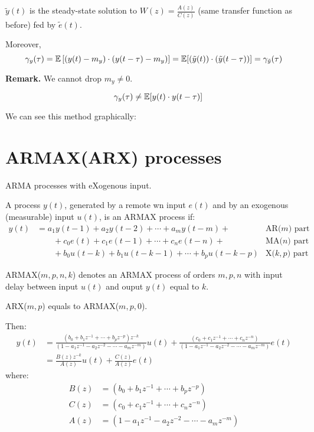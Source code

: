 $\tilde{y}(t)$ is the steady-state solution to $W(z)=\frac{A(z)}{C(z)}$ (same transfer function as before) fed by $\tilde{e}(t)$.

Moreover,
$$
\gamma_{y}(\tau)=\mathbb{E}\left[\left(y(t)-m_{y}\right) \cdot\left(y(t-\tau)-m_{y}\right)\right]=\mathbb{E}[(\tilde{y}(t)) \cdot(\tilde{y}(t-\tau))]=\gamma_{\tilde{y}}(\tau)
$$

\textbf{Remark.} We cannot drop $m_{y} \neq 0$.

$$\quad \gamma_{y}(\tau) \neq \mathbb{E}[y(t) \cdot y(t-\tau)]$$

We can see this method graphically:


\section{ARMAX(ARX) processes}
ARMA processes with eXogenous input.

A process $y(t)$, generated by a remote \gls{wn} input $e(t)$ and by an exogenous (measurable) input $u(t)$, is an ARMAX process if:
\begin{align*}
	y(t)&=a_{1} y(t-1)+a_{2} y(t-2)+\cdots+a_{m} y(t-m)+ &\text{AR($m$) part}\\
	&\qquad+c_{0} e(t)+c_{1} e(t-1)+\cdots+c_{n} e(t-n)+ &\text{MA($n$) part} \\
	&\qquad+b_{0} u(t-k)+b_{1} u(t-k-1)+\cdots+b_{p} u(t-k-p)  &\text{X($k,p$) part}
\end{align*}

ARMAX($m,p,n,k$) denotes an ARMAX process of orders $m,p,n$ with input delay between input $u(t)$ and ouput $y(t)$ equal to $k$.

ARX($m,p$) equals to ARMAX($m,p,0$).

Then:
\begin{align*}
	y(t) &= \frac{\left(b_{0}+b_{1} z^{-1}+\cdots+b_{p} z^{-p}\right) z^{-k}}{\left(1-a_{1} z^{-1}-a_{2} z^{-2}-\cdots-a_{m} z^{-m}\right)} u(t)+\frac{\left(c_{0}+c_{1} z^{-1}+\cdots+c_{n} z^{-n}\right)}{\left(1-a_{1} z^{-1}-a_{2} z^{-2}-\cdots-a_{m} z^{-m}\right)} e(t)\\
	&=\frac{B(z) z^{-k}}{A(z)} u(t)+\frac{C(z)}{A(z)} e(t)
\end{align*}
where:
\begin{align*}
	B(z) &= \left(b_{0}+b_{1} z^{-1}+\cdots+b_{p} z^{-p}\right)\\
	C(z) &= \left(c_{0}+c_{1} z^{-1}+\cdots+c_{n} z^{-n}\right)\\
	A(z) &= \left(1-a_{1} z^{-1}-a_{2} z^{-2}-\cdots-a_{m} z^{-m}\right)
\end{align*}


